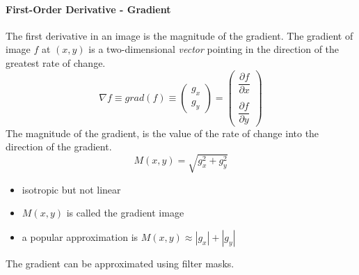 \paragraph{First-Order Derivative - Gradient}
The first derivative in an image is the magnitude of the gradient.
The gradient of image $f$ at $(x,y)$ is a two-dimensional \emph{vector} pointing in the direction of the greatest rate of change.
\begin{equation}
\nabla f \equiv grad(f) \equiv \begin{pmatrix}g_x\\g_y\end{pmatrix} = \begin{pmatrix} \dfrac{\partial f}{\partial x} \\ \\ \dfrac{\partial f}{\partial y} \end{pmatrix}
\end{equation}
The magnitude of the gradient, is the value of the rate of change into the direction of the gradient.
\begin{equation}
M(x,y) = \sqrt{g_x^2 + g_y^2}
\end{equation}
\begin{itemize}
\item isotropic but not linear
\item $M(x,y)$ is called the gradient image
\item a popular approximation is $M(x,y) \approx |g_x| + |g_y|$
\end{itemize}

The gradient can be approximated using filter masks.

